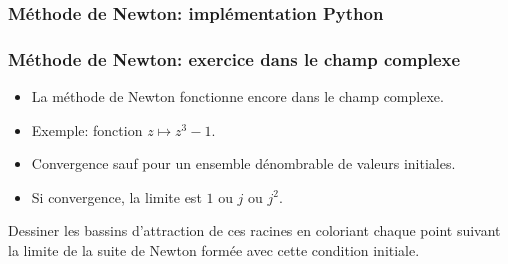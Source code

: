 \begin{frame}
  \frametitle{Méthode de Newton: implémentation Python}

\end{frame}


\begin{frame}
  \frametitle{Méthode de Newton: exercice dans le champ complexe}
\begin{itemize}
  \item La méthode de Newton fonctionne encore dans le champ complexe.
  \item Exemple: fonction $z\mapsto z^3 -1$.
  \item Convergence sauf pour un ensemble dénombrable de valeurs initiales.
  \item Si convergence, la limite est $1$ ou $j$ ou $j^2$.
\end{itemize}

Dessiner les bassins d'attraction de ces racines en coloriant chaque point suivant la limite de la suite de Newton formée avec cette condition initiale.
\end{frame}


